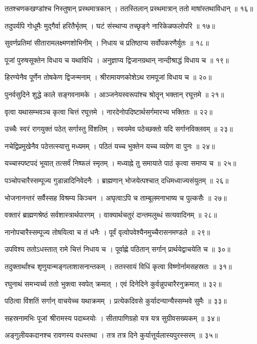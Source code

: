 ततश्चणकखण्डांश्च निस्तुषान् प्रस्थमात्रकान् ।
ततस्तिलान् प्रस्थमात्रान् ततो माषांस्तथाविधान् ॥ १६॥

तदुपर्यपि गोधूमैः मुद्गैर्वा हरितैर्भृतम् ।
घटं संस्थाप्य तच्छृङ्गे नारिकेळफलोपरि ॥ १७॥

सुवर्णप्रतिमां सीतारामलक्ष्मणशोभिनीम् ।
निधाय च प्रतिष्ठाप्य सर्वोपकरणैर्युतः ॥ १८॥

पूजां पुरुषसूक्तेन विधाय च यथाविधि ।
अनुज्ञाप्य द्विजानग्रथान् नान्दीश्राद्धं विधाय च ॥ १९॥

हिरण्येनैव पूर्णेन तोषकेण द्विजन्मनाम् ।
श्रीरामायणकोशेऽथ रामपूजां विधाय च ॥ २०॥

पुनर्वसुदिने शुद्धे काले सङ्गवनामके ।
आञ्जनेयस्वरूपांश्च श्रोतॄन् भक्तान् रघूत्तमे ॥ २१॥

वृत्वा यथासम्भवञ्च कृत्वा चित्तं रघूत्तमे ।
नारदेनोपदिष्टार्थसर्गमारभ्य भक्तितः ॥ २२॥

उच्चैः स्वरं रागयुक्तं पठेत् सर्गास्तु विंशतिम् ।
स्वयमेव पठेच्छक्तो यदि सर्गानविक्लवम् ॥ २३॥

नचेद्विप्रमुखेनैव पठेत्तत्स्यात्तु मध्यमम् ।
पठितं यच्च भुक्तेन यच्च व्यग्रेण वा पुनः ॥ २४॥

यच्चास्पष्टपदं भूयात् तत्सर्वं निष्फलं स्मृतम् ।
मध्याह्ने तु समायाते पाठं कृत्वा समाप्य च ॥ २५॥

पञ्चोपचारैस्सम्पूज्य गुडान्नादिनिवेदनैः ।
ब्राह्मणान् भोजयेत्पश्चात् दधिमध्वाज्यसंयुतम् ॥ २६॥

भोजनानन्तरं सर्वैस्सह विश्रम्य किञ्चन ।
अघृत्वाऽपि च ताम्बूलमनाभाष्य च पुल्कसैः ॥ २७॥

वक्तारं ब्राह्मणश्रेष्ठं सर्वशास्त्रार्थपारगम् ।
वाक्यार्थचतुरं दान्तमलुब्धं सत्यवादिनम् ॥ २८॥

नानोपचारैस्सम्पूज्य तोषयित्वा च तं धनैः ।
पूर्वं वृत्वोपवेश्यैनमुच्चैरासनमण्डले ॥ २९॥

उपविश्य ततोऽधस्तात् रामे चित्तं निधाय च ।
पूर्वाह्णे पठितान् सर्गान् प्रार्थयेद्वाचयेति च ॥ ३०॥

तदुक्तार्थांश्च श‍ृणुयान्मङ्गलाशासनान्तकम् ।
ततस्सायं विधिं कृत्वा विष्णोर्नामसहस्रतः ॥ ३१॥

रघुनाथं समभ्यर्च्य ततो भुक्त्वा स्वपेत् क्रमात् ।
एवं दिनेदिने कुर्वन्नुपचारैरनुक्रमात् ॥ ३२॥

पठित्वा विंशतिं सर्गान् वाचयेच्च यथाक्रमम् ।
प्रत्येकदिवसे कुर्यादन्यान्यैस्सम्भवे सुमैः ॥ ३३॥

सहस्रनामभिः पूजां श्रीरामस्य पदाब्जयोः ।
सीतापाणिग्रहो यत्र यत्र सुग्रीवसख्यकम् ॥ ३४॥

अङ्गुलीयकदानश्च रावणस्य वधस्तथा ।
तत्र तत्र दिने कुर्यात्तूर्यलास्यपुरस्सरम् ॥ ३५॥

